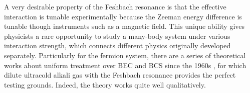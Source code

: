 A very desirable property of the Feshbach resonance is that the effective interaction is tunable experimentally because the Zeeman energy difference is tunable though  instruments such as a magnetic field.  
This unique ability gives physicists a rare opportunity to study  a many-body system under various interaction strength, which connects different physics originally developed separately.  Particularly for the fermion system, there are a series of  theoretical works about uniform treatment over BEC and BCS since the 1960s \cite{Eagle,LeggettCrossover,Nozieres,RanderiaBEC}, for which dilute ultracold alkali gas with the Feshbach resonance provides the perfect testing grounds.  Indeed,  the theory works quite well  qualitatively.  




